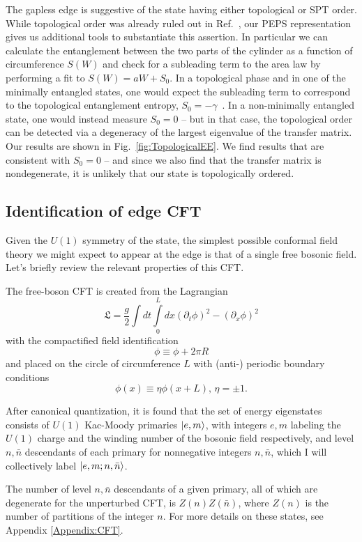 The gapless edge is suggestive of the state having either topological or SPT order.
While topological order was already ruled out in Ref.~\cite{kimchi2013}, our PEPS
representation gives us additional tools to substantiate this assertion. In particular
we can calculate the entanglement between the two parts of the cylinder as a function
of circumference $S(W)$ and check for a subleading term to the area law by performing
a fit to $S(W) = aW + S_0$. In a topological phase and in one of the minimally entangled
states, one would expect the subleading term to correspond to the topological entanglement
entropy, $S_0 = -\gamma$~\cite{kitaev,levin,jiang}.
In a non-minimally entangled state, one would instead measure $S_0 = 0$
-- but in that case, the topological order can be detected via a degeneracy of
 the largest eigenvalue of the transfer matrix.
Our results are shown in Fig.~\ref{fig:TopologicalEE}. We find results that are consistent
with $S_0 = 0$ -- and since we also find that the transfer matrix is nondegenerate,
it is unlikely that our state is topologically ordered.


\subsection{Identification of edge CFT}
\label{sec:CFT}

Given the $U(1)$ symmetry of the state, the simplest possible
conformal field theory we might expect to appear at the edge is that
of a single free bosonic field.
Let's briefly review the relevant properties of this CFT.\cite{diFrancesco}

The free-boson CFT is created from the Lagrangian
$$ \mathfrak{L} = \frac{g}{2}\int dt \int\limits_0^L dx (\partial_t \phi)^2 - (\partial_x \phi)^2$$
with the compactified field identification
$$ \phi \equiv \phi + 2\pi R$$
and placed on the circle of circumference $L$ with (anti-) periodic boundary conditions
$$ \phi(x) \equiv \eta \phi(x+L), \, \eta=\pm 1.$$


After canonical quantization, it is found that the set of energy
eigenstates consists of $U(1)$ Kac-Moody primaries $\vert e, m \rangle$, with
integers $e, m$ labeling the $U(1)$ charge and the winding number of
the bosonic field respectively, and level $n, \bar{n}$ descendants of each primary for
nonnegative integers $n,\bar{n}$,
which I will collectively label $\vert e, m; n, \bar{n} \rangle$.

The number of level $n, \bar{n}$ descendants of a given
primary, all of which are degenerate for the unperturbed CFT, is $Z(n) Z(\bar{n})$, where
$Z(n)$ is the number of partitions of the integer $n$.
For more details on these states, see Appendix \ref{Appendix:CFT}.

